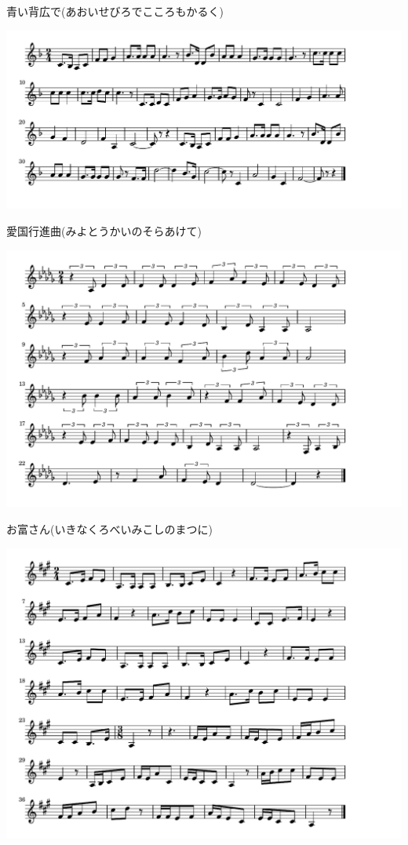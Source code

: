 \documentclass[a4paper]{ltjsarticle}
\begin{document}
\vspace{-10mm} \hspace{10mm}
青い背広で(あおいせびろでこころもかるく)

\includegraphics[clip]{aikokukoushinkyoku_crop.pdf}

\vspace{-10mm} \hspace{10mm}
愛国行進曲(みよとうかいのそらあけて)

\includegraphics[clip]{otomisan_crop.pdf}

\vspace{-10mm} \hspace{10mm}
お富さん(いきなくろべいみこしのまつに)

\includegraphics[clip]{canary_crop.pdf}
\end{document}
